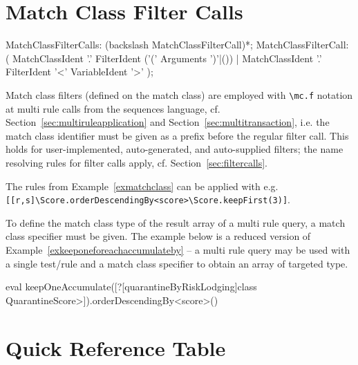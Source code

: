 \section{Match Class Filter Calls}

\begin{rail}
	MatchClassFilterCalls: (backslash MatchClassFilterCall)*;
  MatchClassFilterCall: ( MatchClassIdent '.' FilterIdent ('(' Arguments ')'|()) | MatchClassIdent '.' FilterIdent '<' VariableIdent '>' );
\end{rail}

Match class filters (defined on the match class) are employed with \verb#\mc.f# notation at multi rule calls from the sequences language, cf. Section~\ref{sec:multiruleapplication} and Section~\ref{sec:multitransaction}, i.e. the match class identifier must be given as a prefix before the regular filter call.
This holds for user-implemented, auto-generated, and auto-supplied filters; the name resolving rules for filter calls apply, cf. Section~\ref{sec:filtercalls}.

\begin{example}
The rules from Example~\ref{exmatchclass} can be applied with e.g.\\
\verb#[[r,s]\Score.orderDescendingBy<score>\Score.keepFirst(3)]#.
\end{example}

To define the match class type of the result array of a multi rule query, a match class specifier must be given.
The example below is a reduced version of Example~\ref{exkeeponeforeachaccumulateby} -- a multi rule query may be used with a single test/rule and a match class specifier to obtain an array of targeted type.

\begin{example}
	\begin{grshell}
	eval keepOneAccumulate([?[quarantineByRiskLodging]\<class QuarantineScore>]).orderDescendingBy<score>()
	\end{grshell}
\end{example}

\pagebreak

\section{Quick Reference Table}

